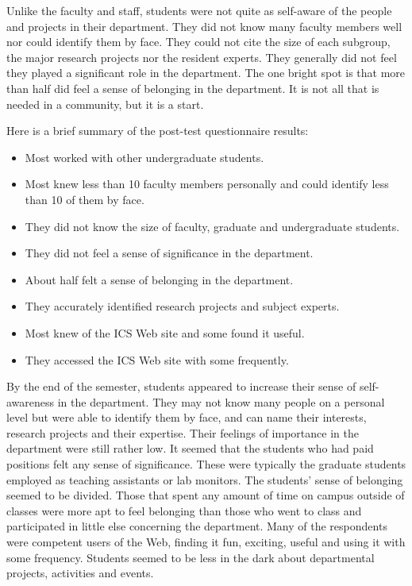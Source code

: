 Unlike the faculty and staff, students were not quite as self-aware of the
people and projects in their department.  They did not know many faculty
members well nor could identify them by face.  They could not cite the size of
each subgroup, the major research projects nor the resident experts.  They
generally did not feel they played a significant role in the department.  The
one bright spot is that more than half did feel a sense of belonging in the
department.  It is not all that is needed in a community, but it is a start.

Here is a brief summary of the post-test questionnaire results:

\begin{itemize}
\item{Most worked with other undergraduate students.}
\item{Most knew less than 10 faculty members personally and could identify
  less than 10 of them by face.}
\item{They did not know the size of faculty, graduate and undergraduate
  students.}
\item{They did not feel a sense of significance in the department.}
\item{About half felt a sense of belonging in the department.}
\item{They accurately identified research projects and subject experts.}
\item{Most knew of the ICS Web site and some found it useful.}
\item{They accessed the ICS Web site with some frequently.}
\end{itemize}

By the end of the semester, students appeared to increase their sense of
self-awareness in the department.  They may not know many people on a personal
level but were able to identify them by face, and can name their interests,
research projects and their expertise.  Their feelings of importance in the
department were still rather low.  It seemed that the students who had paid
positions felt any sense of significance.  These were typically the graduate
students employed as teaching assistants or lab monitors.  The students' sense
of belonging seemed to be divided.  Those that spent any amount of time on
campus outside of classes were more apt to feel belonging than those who went
to class and participated in little else concerning the department.  Many of
the respondents were competent users of the Web, finding it fun, exciting,
useful and using it with some frequency.  Students seemed to be less in the
dark about departmental projects, activities and events.

